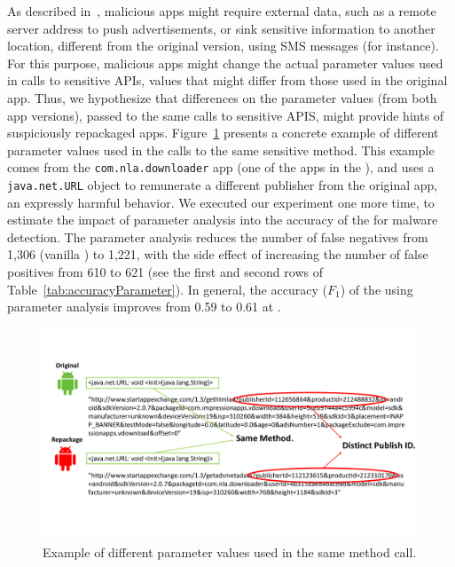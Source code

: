 As described in~\cite{le2018towards}, malicious apps might require external data,
such as a remote server address to push advertisements, or sink sensitive information to another location,
different from the original version, using SMS messages (for instance). For this purpose, malicious apps
might change the actual parameter values used in calls to sensitive APIs, values that might differ from those
used in the original app. Thus, we hypothesize that differences on the parameter values (from both app versions), passed to the same calls to
sensitive APIS, might provide hints of suspiciously repackaged apps. Figure~\ref{fig:parameterDiff} presents a concrete example of
different parameter values used in the calls to the same sensitive method. This example comes from the \texttt{com.nla.downloader} app
(one of the apps in the \cds), and uses a \texttt{java.net.URL} object to remunerate a different publisher from the original app, an expressly harmful behavior. We executed our
experiment one more time, to estimate the impact of parameter analysis into the accuracy of the \mas for
malware detection. 
The parameter analysis reduces the number of false negatives from 1,306 (vanilla \mas) to 1,221, with the side effect of
increasing the number of false positives from 610 to 621 (see the first and second rows of Table~\ref{tab:accuracyParameter}).
In general, the accuracy ($F_1$) of the \mas using parameter analysis improves from 0.59 to 0.61 at \cds.

\begin{figure}[t]
\centering
\includegraphics[scale=0.3]{images/parameterDiff.pdf}
\caption{Example of different parameter values used in the same method call.}
 \label{fig:parameterDiff}
\end{figure}

